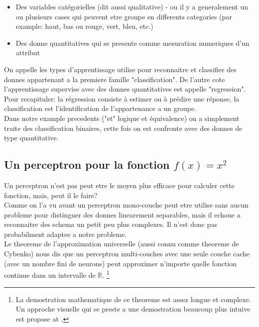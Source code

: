\documentclass[twoside,openright,a4paper,11pt,french]{article}
\begin{document}
\begin{itemize}
\item Des variables catégorielles (dit aussi qualitative) - ou il y a generalement
      un ou plusieurs cases qui peuvent etre groupe en differents categories 
     (par example: haut, bas ou rouge, vert, bleu, etc.)
\item Des donne quantitatives qui se presente comme mesuration numeriques d'un attribut
\end{itemize}

On appelle les types d'apprentissage utilise pour reconnaitre et classifier des donnes
appartenant a la premiere famille "classification". De l'autre cote l'apprentissage
supervise avec des donnes quantitatives est appelle "regression".\cite{kindsNN}\\

Pour recapituler: la régression consiste à estimer ou à prédire une réponse,
la classification est l'identification de l'appartenance a un groupe.\\

Dans notre example precedents ("et" logique et équivalence) on a simplement
traite des classification binaires, cette fois on est confronte avec des donnes
de type quantitative.


\subsection{Un perceptron pour la fonction $f(x) = x^2$}
Un perceptron n'est pas peut etre le moyen plus efficace pour calculer cette 
fonction, mais, peut il le faire?\\

Comme on l'a vu avant un perceptron mono-couche peut etre utilise sans aucun
probleme pour distinguer des donnes linearement separables, mais il echoue 
a reconnaitre des schema un petit peu plus complexes. Il n'est donc pas 
probabilment adaptee a notre probleme.\\

Le theoreme de l'approximation universelle (aussi connu comme theoreme de Cybenko) 
nous dis que un perceptron multi-couches avec une seule couche cache (avec un nombre
fini de neurons) peut approximer n'importe quelle fonction continue dans un 
intervalle de $\mathbb{R}$.
\footnote{
La demostration mathematique de ce theoreme est assez longue et complexe. Un approche visuelle
qui se preste a une demostration beaucoup plus intuive est propose at \cite{visuniprof}.
}
\cite{cybthm}
\end{document}
